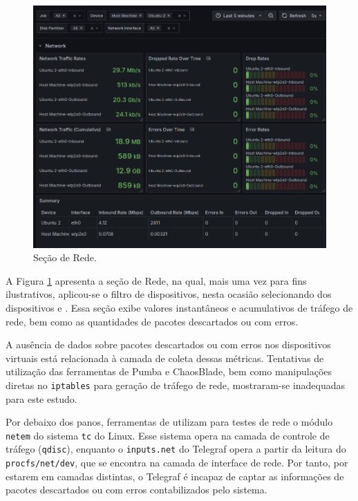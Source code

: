 {\begin{figure}[H]
\centering
\color{red}
\setlength{\abovecaptionskip}{-20pt}
\includegraphics[width=\textwidth]{Imagens/chap04/dashboard/network.png}
\caption{Seção de Rede.}
\label{fig:dashboard-network}
\end{figure}

A Figura \ref{fig:dashboard-network} apresenta a seção de Rede, na qual, mais uma vez para fins ilustrativos, aplicou-se o filtro de dispositivos, nesta ocasião selecionando dos dispositivos  e . Essa seção exibe valores instantâneos e acumulativos de tráfego de rede, bem como as quantidades de pacotes descartados ou com erros.

A ausência de dados sobre pacotes descartados ou com erros nos dispositivos virtuais está relacionada à camada de coleta dessas métricas. Tentativas de utilização das ferramentas de  Pumba e ChaosBlade, bem como manipulações diretas no \verb|iptables| para geração de tráfego de rede, mostraram-se inadequadas para este estudo.

Por debaixo dos panos, ferramentas de  utilizam para testes de rede o módulo \verb|netem| do sistema \verb|tc| do Linux. Esse sistema opera na camada de controle de tráfego (\verb|qdisc|), enquanto o  \verb|inputs.net| do Telegraf opera a partir da leitura do \verb|procfs/net/dev|, que se encontra na camada de interface de rede. Por tanto, por estarem em camadas distintas, o Telegraf é incapaz de captar as informações de pacotes descartados ou com erros contabilizados pelo sistema.

}
